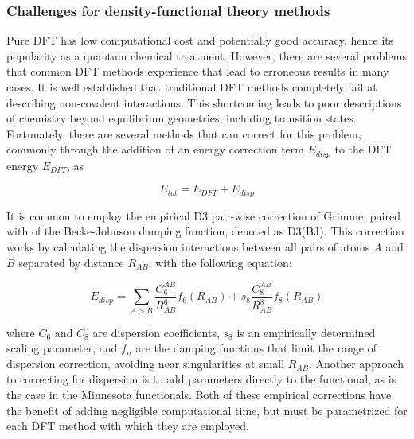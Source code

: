 \begin{doublespace}
\subsubsection{Challenges for density-functional theory methods}

Pure DFT has low computational cost and potentially good accuracy, hence its
popularity as a quantum chemical treatment. However, there are several problems
that common DFT methods experience that lead to erroneous results in many
cases.\cite{Cohen2012} It is well established that traditional DFT methods
completely fail at describing non-covalent
interactions.\cite{DiLabio2016,OterodelaRoza2017} This shortcoming leads to
poor descriptions of chemistry beyond equilibrium geometries, including
transition states. Fortunately, there are several methods that can correct for
this problem, commonly through the addition of an energy correction term
$E_{disp}$ to the DFT energy $E_{DFT}$, as

\begin{equation}
  E_{tot} = E_{DFT} + E_{disp}
\end{equation}

\noindent It is common to employ the empirical D3 pair-wise correction of
Grimme,\cite{Grimme2010} paired with of the Becke-Johnson damping
function,\cite{Johnson2006} denoted as D3(BJ). This correction works by
calculating the dispersion interactions between all pairs of atoms $A$ and $B$
separated by distance $R_{AB}$, with the following equation:

\begin{equation}
  E_{disp} = \sum_{A>B} \frac{C_6^{AB}}{R_{AB}^6} f_6(R_{AB}) + s_8
  \frac{C_8^{AB}}{R_{AB}^8} f_8(R_{AB})
\end{equation}

\noindent where $C_6$ and $C_8$ are dispersion coefficients, $s_8$ is an
empirically determined scaling parameter, and $f_n$ are the damping functions
that limit the range of dispersion correction, avoiding near singularities at
small $R_{AB}$. Another approach to correcting for dispersion is to add
parameters directly to the functional, as is the case in the Minnesota
functionals.\cite{Zhao2006,Zhao2006} Both of these empirical corrections have
the benefit of adding negligible computational time, but must be parametrized
for each DFT method with which they are employed.


\end{doublespace}
